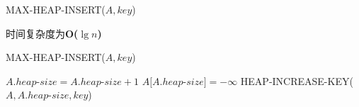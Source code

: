 \documentclass[11pt,UTF8]{ctexart}
\begin{document}
	\begin{algorithm}
	\caption{MAX-HEAP-INSERT($A, key$)}
	时间复杂度为\textbf{O($\lg n$)}
	
	MAX-HEAP-INSERT($A,key$)
		\begin{algorithmic}[1]
			\State $A.heap$-$size = A.heap$-$size + 1$
			\State $A[A.heap$-$size] = -\infty$
			\State HEAP-INCREASE-KEY($A,A.heap$-$size,key$)
		\end{algorithmic}
	\end{algorithm}	
\end{document}

